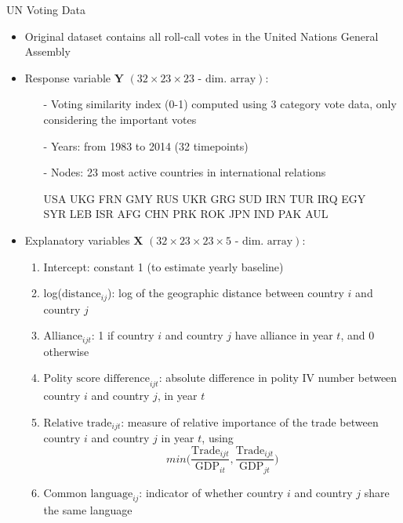 \documentclass[serif,mathserif,final,table]{beamer}
\begin{document}
\begin{frame}{}
\begin{columns}[t]
\begin{column}{0.235\linewidth}
\begin{block}{UN Voting Data}
 	  	\begin{itemize}
 	  		\item Original dataset \cite{12379_2016} contains all roll-call votes in the United Nations General Assembly\\
 	  		\item Response variable $\boldsymbol{Y}$  \small{$(32 \times 23 \times 23 \mbox{ - dim. array})$}:
 	  		\begin{enumerate}
 	  		\item [-] Voting similarity index (0-1)
computed using 3 category vote data, only considering the important votes
\item [-] Years: from 1983 to 2014 (32 timepoints)
\item [-] Nodes: 23 most active countries in international relations
\begin{tabbing}
	\footnotesize
USA UKG FRN GMY RUS UKR GRG SUD IRN TUR IRQ EGY \\
	\footnotesize{SYR LEB ISR AFG CHN PRK ROK JPN IND PAK AUL}
\end{tabbing}
 	  		\end{enumerate}
 	  		\item Explanatory variables $\boldsymbol{X}$  \small{$(32 \times 23 \times 23 \times 5 \mbox{ - dim. array})$}:
 	  		\begin{enumerate}
             	\item Intercept: constant 1 (to estimate yearly baseline)
 	  			\item log($\mbox{distance}_{ij}$): log of the geographic distance between country $i$ and country $j$
 	  			\item $\mbox{Alliance}_{ijt}$: 1 if country $i$ and country $j$ have alliance in year $t$, and 0 otherwise
 	  			\item $\mbox{Polity score difference}_{ijt}$: absolute difference in polity IV number between country $i$ and country $j$, in year $t$
 	  			\item $\mbox{Relative trade}_{ijt}$: measure of relative importance of the trade between country $i$ and country $j$ in year $t$, using $$min\Big(\frac{\mbox{Trade}_{ijt}}{\mbox{GDP}_{it}}, \frac{\mbox{Trade}_{ijt}}{\mbox{GDP}_{jt}}\Big)$$
 	  			\item $\mbox{Common language}_{ij}$: indicator of whether country $i$ and country $j$ share the same language
 	  		\end{enumerate}
 	  	\end{itemize}
 	            \end{block} 	
 	        

\end{column}
\end{columns}
\end{frame}
\end{document}
